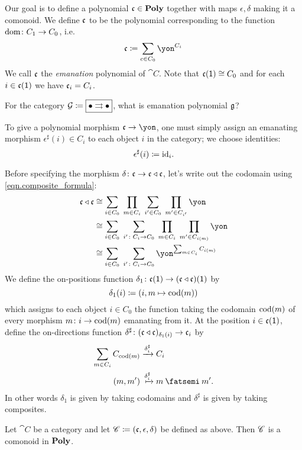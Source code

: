 \documentclass[DynamicalBook]{subfiles}
\begin{document}
Our goal is to define a polynomial $\mathfrak{c}\in\textbf{Poly}$ together with maps $\epsilon,\delta$ making it a comonoid. We define $\mathfrak{c}$ to be the polynomial corresponding to the function $\operatorname{dom}\colon C_1\to C_0$, i.e.\
\[
  \ema{c}\coloneqq \sum_{c\in C_0}\yon^{C_i}
\]
We call $\mathfrak{c}$ the \emph{emanation} polynomial of $\cat{C}$. Note that $\mathfrak{c}(\textsf{1})\cong C_0$ and for each $i\in\mathfrak{c}(\textsf{1})$ we have $\mathfrak{c}_i=C_i$.

\begin{exercise}
For the category $\mathcal{G}\coloneqq\fbox{$\bullet\rightrightarrows\bullet$}$, what is emanation polynomial $\mathfrak{g}$?
\end{exercise}

To give a polynomial morphism $\ema{c}\to\yon$, one must simply assign an emanating morphism $\epsilon^\sharp(i) \in C_i$ to each object $i$ in the category; we choose identities:
\[\epsilon^\sharp(i)\coloneqq\mathrm{id}_i.\]

Before specifying the morphism $\delta\colon\mathfrak{c}\to\mathfrak{c}\mathbin{\triangleleft}\mathfrak{c}$, let's write out the codomain using \cref{eqn.composite_formula}:
\begin{align*}
  \ema{c}\tri\ema{c}&\cong
  \sum_{i\in C_0}\;\prod_{m\in C_i}\;\sum_{i'\in C_0}\;\prod_{m'\in C_{i'}}\yon\\&\cong
  \sum_{i\in C_0}\;\sum_{i'\colon C_i\to C_0}\;\prod_{m\in C_i}\;\prod_{m'\in C_{i(m)}}\yon\\&\cong
  \sum_{i\in C_0}\;\sum_{i'\colon C_i\to C_0}\yon^{\sum_{m\in C_i}C_{i(m)}}
\end{align*}
We define the on-positions function $\delta_1\colon\mathfrak{c}(\textsf{1})\to(\mathfrak{c}\mathbin{\triangleleft}\mathfrak{c})(\textsf{1})$ by
\begin{equation}\label{eqn.emanation_cat_delta}
\delta_1(i)\coloneqq (i,m\mapsto\operatorname{cod}(m))
\end{equation}
which assigns to each object $i\in C_0$ the function taking the codomain $\operatorname{cod}(m)$ of every morphism $m\colon i\to\operatorname{cod}(m)$ emanating from it. At the position $i\in\mathfrak{c}(\textsf{1})$, define the on-directions function $\delta^\sharp\colon(\mathfrak{c}\mathbin{\triangleleft}\mathfrak{c})_{\delta_1(i)}\to\mathfrak{c}_i$ by
\begin{align}\nonumber
  \sum_{m\in C_i}C_{\cod(m)}&\To{\delta^\sharp_i}C_i\\\label{eqn.emanation_cat_delta_sharp}
  (m,m')&\Mapsto{\delta^\sharp_i} m\then m'.
\end{align}
In other words $\delta_1$ is given by taking codomains and $\delta^\sharp$ is given by taking composites.

\begin{proposition}
Let $\cat{C}$ be a category and let $\mathscr{C}\coloneqq(\mathfrak{c},\epsilon,\delta)$ be defined as above. Then $\mathscr{C}$ is a comonoid in $\textbf{Poly}$.
\end{proposition}
\end{document}
